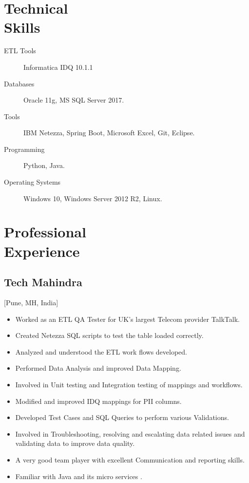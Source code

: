\documentclass{mycv}
\begin{document}
\section{Technical \\ Skills}

\begin{description}
  \item[ETL Tools] Informatica IDQ 10.1.1
  \item[Databases] Oracle 11g, MS SQL Server 2017.
  \item[Tools] IBM Netezza, Spring Boot, Microsoft Excel, Git, Eclipse.
  \item[Programming] Python, Java.
  \item[Operating Systems] Windows 10, Windows Server 2012 R2, Linux.
\end{description}


\section{Professional \\ Experience }

\subsection{Tech Mahindra}[Pune, MH, India]
\begin{positions}
\end{positions}

\begin{itemize}
  \item Worked as an ETL QA Tester for UK's largest Telecom provider TalkTalk.
  \item Created Netezza SQL scripts to test the table loaded correctly.
  \item Analyzed and understood the ETL work flows developed.
  \item Performed Data Analysis and improved Data Mapping.
  \item Involved in Unit testing and Integration testing of mappings and workflows.
  \item Modified and improved IDQ mappings for PII columns.
  \item Developed Test Cases and SQL Queries to perform various Validations.
  \item Involved in Troubleshooting, resolving and escalating data related issues and validating data to improve data quality.
  \item A very good team player with excellent Communication and reporting skills.
  \item Familiar with Java and its micro services .
  
\end{itemize}
\end{document}
